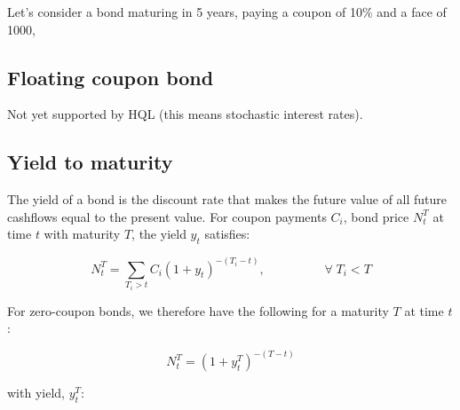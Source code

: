 \documentclass[11pt,a4paper]{article}
\numberwithin{equation}{section}
\begin{document}

	Let's consider a bond maturing in 5 years, paying a coupon of 10\% and a face of 1000,


	\subsection{Floating coupon bond}
	Not yet supported by HQL (this means stochastic interest rates).

	\subsection{Yield to maturity}

	The yield of a bond is the discount rate that makes the future value of all future
	cashflows equal to the present value. For coupon payments $C_i$, bond price $N_t^T$
	at time $t$ with maturity $T$, the yield $y_t$ satisfies:

	\[
	N_t^T = \sum_{T_i > t} C_i (1+y_t)^{-(T_i - t)}, \hspace{2cm} \forall\; T_i < T
	\]

	For zero-coupon bonds, we therefore have the following for a maturity $T$ at
	time $t$:

	\[
	N_t^T = (1+y_t^T)^{-(T-t)}
	\]

	with yield, $y_t^T$:
\end{document}
